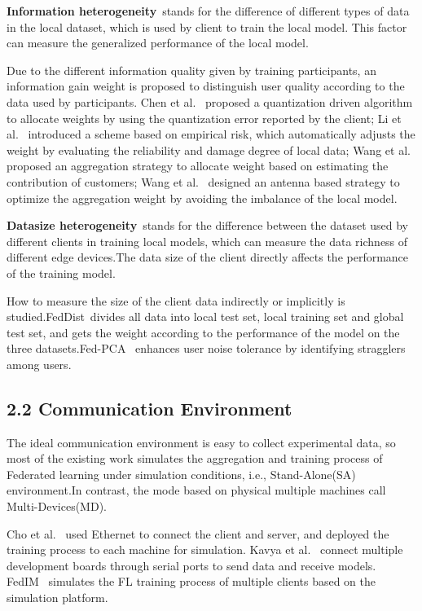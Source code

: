 \documentclass[twoside,twocolumn]{article}
\begin{document}
	\textbf{Information heterogeneity}\ stands for the difference of different types of data in the local dataset, which is used by client to train the local model. This factor can measure the generalized performance of the local model.
	
	Due to the different information quality given by training participants, an information gain weight is proposed to distinguish user quality according to the data used by participants. Chen et al.~\cite{chen2021dynamic} proposed a quantization driven algorithm to allocate weights by using the quantization error reported by the client; Li et al.~\cite{li2021auto} introduced a scheme based on empirical risk, which automatically adjusts the weight by evaluating the reliability and damage degree of local data; Wang et al.~\cite{wang2021reputation} proposed an aggregation strategy to allocate weight based on estimating the contribution of customers; Wang et al.~\cite{wang2020attention} designed an antenna based strategy to optimize the aggregation weight by avoiding the imbalance of the local model.

	\textbf{Datasize heterogeneity}\ stands for the difference between the dataset used by different clients in training local models, which can measure the data richness of different edge devices.The data size of the client directly affects the performance of the training model. 
	
	How to measure the size of the client data indirectly or implicitly is studied.FedDist~\cite{sannara2021federated}divides all data into local test set, local training set and global test set, and gets the weight according to the performance of the model on the three datasets.Fed-PCA~\cite{lv2021data} enhances user noise tolerance by identifying stragglers among users.
\subsection{2.2 Communication Environment}
	The ideal communication environment is easy to collect experimental data, so most of the existing work simulates the aggregation and training process of Federated learning under simulation conditions, i.e., Stand-Alone(SA) environment.In contrast, the mode based on physical multiple machines call Multi-Devices(MD).
	
	Cho et al.~\cite{cho2021personalized} used Ethernet to connect the client and server, and deployed the training process to each machine for simulation. Kavya et al.~\cite{kopparapu2022tinyfedtl} connect multiple development boards through serial ports to send data and receive models. FedIM~\cite{gao2021fedim} simulates the FL training process of multiple clients based on the simulation platform.
\end{document}
